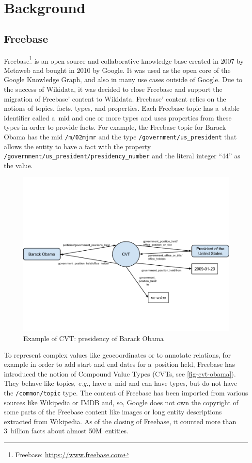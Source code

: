 \documentclass{sig-alternate}
\begin{document}
\section{Background}

\subsection{Freebase}

Freebase\footnote{Freebase: \url{https://www.freebase.com}} is an open source and
collaborative knowledge base created in 2007 by Metaweb and bought in 2010 by Google.
It was used as the open core of the Google Knowledge Graph,
and also in many use cases outside of Google.
Due to the success of Wikidata,
it was decided to close Freebase and support the migration of Freebase' content to Wikidata.
Freebase' content relies on the notions of topics, facts, types, and properties.
Each Freebase topic has a~stable identifier called a~mid and one or more types
and uses properties from these types in order to provide facts.
For example, the Freebase topic for Barack Obama has the mid \texttt{/m/02mjmr}
and the type \texttt{/government/us\_president} that allows the entity to have
a fact with the property \texttt{/government/us\_president/presidency\_number}
and the literal integer ``44'' as the value.

\begin{figure}
\centering
\includegraphics[width=8.45 cm]{img/freebase-cvt-obama.png}
\caption{Example of CVT: presidency of Barack Obama}
\label{fig-cvt-obama}
\end{figure}

To represent complex values like geocoordinates or to annotate relations,
for example in order to add start and end dates for a~position held,
Freebase has introduced the notion of Compound Value Types (CVTs, see \autoref{fig-cvt-obama}).
They behave like topics, \emph{e.g.}, have a~mid and can have types,
but do not have the \texttt{/common/topic} type.
The content of Freebase has been imported from various sources like Wikipedia or IMDB
and, so, Google does not own the copyright of some parts of the Freebase content
like images or long entity descriptions extracted from Wikipedia.
As of the closing of Freebase, it counted more than 3~billion facts
about almost 50M~entities.
\end{document}
